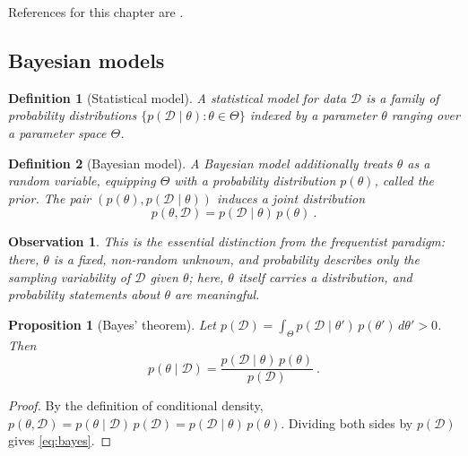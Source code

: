 \documentclass{article}
\newtheorem{prop}{Proposition}
\newtheorem{defn}{Definition}
\newtheorem{obs}{Observation}
\begin{document}
	References for this chapter are \cite{gelman_bda_2013, robert_casella_mcsm_2004}.
	
	\subsection{Bayesian models}
	
	\begin{defn}[Statistical model]
		A \textit{statistical model} for data $\mathcal{D}$ is a family of probability distributions $\{p(\mathcal{D} \mid \theta) : \theta \in \Theta\}$ indexed by a parameter $\theta$ ranging over a parameter space $\Theta$.
	\end{defn}
	
	\begin{defn}[Bayesian model]
		A \textit{Bayesian model} additionally treats $\theta$ as a random variable, equipping $\Theta$ with a probability distribution $p(\theta)$, called the \textit{prior}. The pair $(p(\theta), p(\mathcal{D} \mid \theta))$ induces a joint distribution
		\begin{equation}
			p(\theta, \mathcal{D}) = p(\mathcal{D} \mid \theta) \, p(\theta) \ .
		\end{equation}
	\end{defn}
	
	\begin{obs}
		This is the essential distinction from the frequentist paradigm: there, $\theta$ is a fixed, non-random unknown, and probability describes only the sampling variability of $\mathcal{D}$ given $\theta$; here, $\theta$ itself carries a distribution, and probability statements about $\theta$ are meaningful.
	\end{obs}
	
	\begin{prop}[Bayes' theorem]
		Let $p(\mathcal{D}) = \int_\Theta p(\mathcal{D} \mid \theta') \, p(\theta') \, d\theta' > 0$. Then
		\begin{equation} \label{eq:bayes}
			p(\theta \mid \mathcal{D}) = \frac{p(\mathcal{D} \mid \theta) \, p(\theta)}{p(\mathcal{D})} \ .
		\end{equation}
	\end{prop}
	\begin{proof}
		By the definition of conditional density, $p(\theta, \mathcal{D}) = p(\theta \mid \mathcal{D}) \, p(\mathcal{D}) = p(\mathcal{D} \mid \theta) \, p(\theta)$. Dividing both sides by $p(\mathcal{D})$ gives \eqref{eq:bayes}.
	\end{proof}
	
\end{document}
